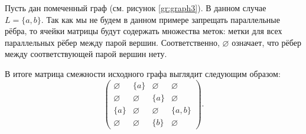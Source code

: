 \begin{marginfigure}
    \begin{center}
        \resizebox{\marginparwidth}{!}{}
    \end{center}
    \caption{Помеченный граф}
    \label{gr:graph3}
\end{marginfigure}
\begin{example}
    Пусть дан помеченный граф (см. рисунок \ref{gr:graph3}).
    В данном случае $L = \{a,b\}$.
    Так как мы не будем в данном примере запрещать параллельные рёбра, то ячейки матрицы будут содержать множества меток: метки для всех параллельных рёбер между парой вершин.
    Соответственно,  $\varnothing$ означает, что рёбер между соответствующей парой вершин нету.

    В итоге матрица смежности исходного графа выглядит следующим образом:
    \[
        \begin{pmatrix}
            \varnothing & \{a\}       & \varnothing & \varnothing \\
            \varnothing & \varnothing & \{a\}       & \varnothing \\
            \{a\}       & \varnothing & \varnothing & \{a,b\}     \\
            \varnothing & \varnothing & \{b\}       & \varnothing
        \end{pmatrix}.
    \]
\end{example}

